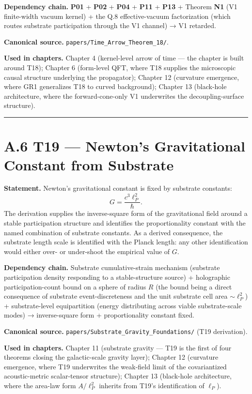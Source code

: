 \documentclass[11pt]{book}
\begin{document}
\textbf{Dependency chain.} \textbf{P01} + \textbf{P02} + \textbf{P04} + \textbf{P11} + \textbf{P13} + Theorem \textbf{N1} (V1 finite-width vacuum kernel) + the Q.8 effective-vacuum factorization (which routes substrate participation through the V1 channel) → V1 retarded.

\textbf{Canonical source.} \texttt{papers/Time\_Arrow\_Theorem\_18/}.

\textbf{Used in chapters.} Chapter 4 (kernel-level arrow of time — the chapter is built around T18); Chapter 6 (form-level QFT, where T18 supplies the microscopic causal structure underlying the propagator); Chapter 12 (curvature emergence, where GR1 generalizes T18 to curved background); Chapter 13 (black-hole architecture, where the forward-cone-only V1 underwrites the decoupling-surface structure).

\bigskip\hrule\bigskip

\section{A.6 T19 — Newton's Gravitational Constant from Substrate}

\textbf{Statement.} Newton's gravitational constant is fixed by substrate constants:
\[
G = \frac{c^3 \ell_P^2}{\hbar}.
\]
The derivation supplies the inverse-square form of the gravitational field around a stable participation structure and identifies the proportionality constant with the named combination of substrate constants. As a derived consequence, the substrate length scale is identified with the Planck length: any other identification would either over- or under-shoot the empirical value of $G$.

\textbf{Dependency chain.} Substrate cumulative-strain mechanism (substrate participation density responding to a stable-structure source) + holographic participation-count bound on a sphere of radius $R$ (the bound being a direct consequence of substrate event-discreteness and the unit substrate cell area $\sim \ell_P^2$) + substrate-level equipartition (energy distributing across viable substrate-scale modes) → inverse-square form + proportionality constant fixed.

\textbf{Canonical source.} \texttt{papers/Substrate\_Gravity\_Foundations/} (T19 derivation).

\textbf{Used in chapters.} Chapter 11 (substrate gravity — T19 is the first of four theorems closing the galactic-scale gravity layer); Chapter 12 (curvature emergence, where T19 underwrites the weak-field limit of the covariantized acoustic-metric scalar-tensor structure); Chapter 13 (black-hole architecture, where the area-law form $A/\ell_P^2$ inherits from T19's identification of $\ell_P$).
\end{document}
